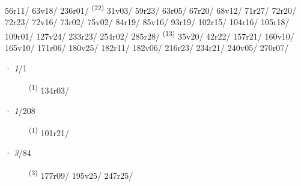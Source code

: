 \begin{description}
\mbox{56r11/} \mbox{63v18/} \mbox{236r01/} \textsuperscript{(22)} \mbox{31v03/} \mbox{59r23/} \mbox{63r05/} \mbox{67r20/} \mbox{68v12/} \mbox{71r27/} \mbox{72r20/} \mbox{72r23/} \mbox{72v16/} \mbox{73r02/} \mbox{75v02/} \mbox{84r19/} \mbox{85v16/} \mbox{93r19/} \mbox{102r15/} \mbox{104r16/} \mbox{105r18/} \mbox{109r01/} \mbox{127v24/} \mbox{233r23/} \mbox{254r02/} \mbox{285r28/} \textsuperscript{(13)} \mbox{35v20/} \mbox{42r22/} \mbox{157r21/} \mbox{160v10/} \mbox{165v10/} \mbox{171r06/} \mbox{180v25/} \mbox{182r11/} \mbox{182v06/} \mbox{216r23/} \mbox{234r21/} \mbox{240v05/} \mbox{270r07/}
\end{description}
\ENTRYEND
\noindent{} · \textit{1}/1 \LEMMALINE
\begin{description}
    \item[]  \textsuperscript{(1)} \mbox{134r03/}
\end{description}
\ENTRYEND
\noindent{} · \textit{1}/208 \LEMMALINE
\begin{description}
    \item[]  \textsuperscript{(1)} \mbox{101r21/}
\end{description}
\ENTRYEND
\noindent{} · \textit{3}/84 \LEMMALINE
\begin{description}
    \item[]  \textsuperscript{(3)} \mbox{177r09/} \mbox{195v25/} \mbox{247r25/}
\end{description}
\ENTRYEND

